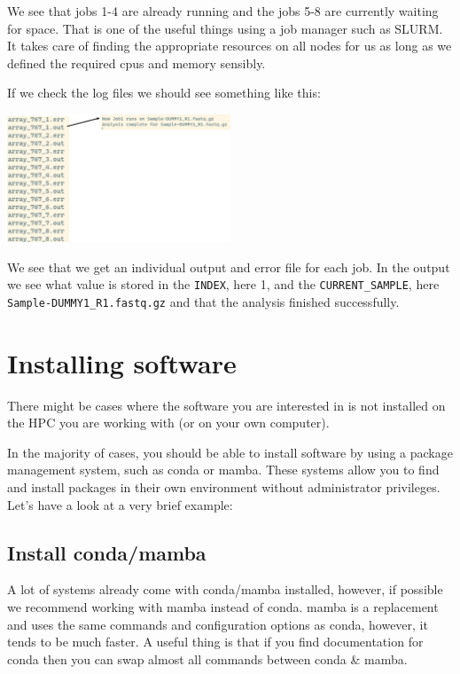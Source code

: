 \documentclass[
  letterpaper,
  DIV=11,
  numbers=noendperiod]{scrreprt}
\begin{document}
\begin{tcolorbox}
We see that jobs 1-4 are already running and the jobs 5-8 are currently
waiting for space. That is one of the useful things using a job manager
such as SLURM. It takes care of finding the appropriate resources on all
nodes for us as long as we defined the required cpus and memory
sensibly.

If we check the log files we should see something like this:

\begin{center}
\includegraphics[width=0.5\textwidth,height=\textheight]{../img/arrays2.png}
\end{center}

We see that we get an individual output and error file for each job. In
the output we see what value is stored in the \texttt{INDEX}, here 1,
and the \texttt{CURRENT\_SAMPLE}, here
\texttt{Sample-DUMMY1\_R1.fastq.gz} and that the analysis finished
successfully.

\end{tcolorbox}

\section{Installing software}\label{installing-software}

There might be cases where the software you are interested in is not
installed on the HPC you are working with (or on your own computer).

In the majority of cases, you should be able to install software by
using a package management system, such as conda or mamba. These systems
allow you to find and install packages in their own environment without
administrator privileges. Let's have a look at a very brief example:

\subsection{Install conda/mamba}\label{install-condamamba}

A lot of systems already come with conda/mamba installed, however, if
possible we recommend working with mamba instead of conda. mamba is a
replacement and uses the same commands and configuration options as
conda, however, it tends to be much faster. A useful thing is that if
you find documentation for conda then you can swap almost all commands
between conda \& mamba.
\end{document}
